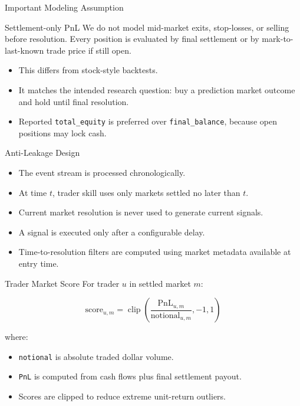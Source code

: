 \documentclass[11pt,aspectratio=169]{beamer}
\begin{document}
\begin{frame}{Important Modeling Assumption}
  \begin{block}{Settlement-only PnL}
    We do not model mid-market exits, stop-losses, or selling before resolution.
    Every position is evaluated by final settlement or by mark-to-last-known trade price if still open.
  \end{block}

  \vspace{0.3cm}
  \begin{itemize}
    \item This differs from stock-style backtests.
    \item It matches the intended research question: buy a prediction market outcome and hold until final resolution.
    \item Reported \texttt{total\_equity} is preferred over \texttt{final\_balance}, because open positions may lock cash.
  \end{itemize}
\end{frame}

\begin{frame}{Anti-Leakage Design}
  \begin{itemize}
    \item The event stream is processed chronologically.
    \item At time $t$, trader skill uses only markets settled no later than $t$.
    \item Current market resolution is never used to generate current signals.
    \item A signal is executed only after a configurable delay.
    \item Time-to-resolution filters are computed using market metadata available at entry time.
  \end{itemize}
\end{frame}

\begin{frame}{Trader Market Score}
  For trader $u$ in settled market $m$:

  \[
    \text{score}_{u,m}
    =
    \operatorname{clip}
    \left(
      \frac{\text{PnL}_{u,m}}{\text{notional}_{u,m}},
      -1,
      1
    \right)
  \]

  \vspace{0.2cm}
  where:
  \begin{itemize}
    \item \texttt{notional} is absolute traded dollar volume.
    \item \texttt{PnL} is computed from cash flows plus final settlement payout.
    \item Scores are clipped to reduce extreme unit-return outliers.
  \end{itemize}
\end{frame}
\end{document}
